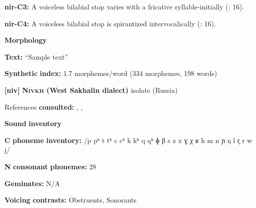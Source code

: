 \documentclass[output=paper]{langsci/langscibook}
\begin{document}
\begin{styleBody}
\textbf{nir-C3:} A voiceless bilabial stop varies with a fricative syllable-initially (\citealt{MayMay1981}: 16).
\end{styleBody}

\begin{styleBody}
\textbf{nir-C4:} A voiceless bilabial stop is spirantized intervocalically (\citealt{MayMay1981}: 16).
\end{styleBody}

\begin{styleBody}
\textbf{Morphology}
\end{styleBody}

\begin{styleBody}
\textbf{Text:} “Sample text” \citep[172-177]{May1997}
\end{styleBody}

\begin{styleBody}
\textbf{Synthetic} \textbf{index:} 1.7 morphemes/word (334 morphemes, 198 words)
\end{styleBody}

\begin{styleBody}
\textbf{[niv]}   \textbf{\textsc{Nivkh} \textbf{(West} \textbf{Sakhalin} \textbf{dialect)}}  isolate (Russia)
\end{styleBody}

\begin{styleBody}
References \textbf{consulted:} \citet{Gruzdeva1998}, \citet{Kreinovich1979}, \citet{Shiraishi2006}
\end{styleBody}

\begin{styleBody}
\textbf{Sound} \textbf{inventory}
\end{styleBody}

\begin{styleBody}
\textbf{C} \textbf{phoneme} \textbf{inventory:} /p pʰ t tʰ c cʰ k kʰ q qʰ ɸ β s z x ɣ χ ʁ h m n ɲ ŋ l r̥ r w j/
\end{styleBody}

\begin{styleBody}
\textbf{N} \textbf{consonant} \textbf{phonemes:} 28
\end{styleBody}

\begin{styleBody}
\textbf{Geminates:} N/A
\end{styleBody}

\begin{styleBody}
\textbf{Voicing} \textbf{contrasts:} Obstruents, Sonorants
\end{styleBody}
\end{document}
